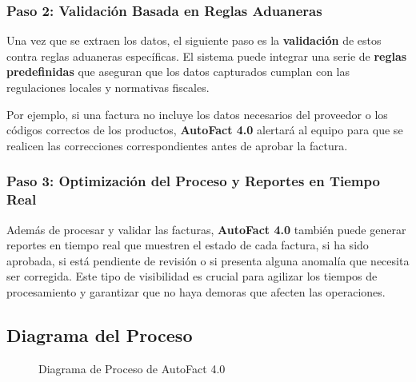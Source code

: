 \subsubsection{Paso 2: Validación Basada en Reglas Aduaneras}

Una vez que se extraen los datos, el siguiente paso es la \textbf{validación} de estos contra reglas aduaneras específicas. El sistema puede integrar una serie de \textbf{reglas predefinidas} que aseguran que los datos capturados cumplan con las regulaciones locales y normativas fiscales.

Por ejemplo, si una factura no incluye los datos necesarios del proveedor o los códigos correctos de los productos, \textbf{AutoFact 4.0} alertará al equipo para que se realicen las correcciones correspondientes antes de aprobar la factura.

\subsubsection{Paso 3: Optimización del Proceso y Reportes en Tiempo Real}

Además de procesar y validar las facturas, \textbf{AutoFact 4.0} también puede generar reportes en tiempo real que muestren el estado de cada factura, si ha sido aprobada, si está pendiente de revisión o si presenta alguna anomalía que necesita ser corregida. Este tipo de visibilidad es crucial para agilizar los tiempos de procesamiento y garantizar que no haya demoras que afecten las operaciones.

\subsection{Diagrama del Proceso}

\begin{figure}[H]
    \centering
    \caption{Diagrama de Proceso de AutoFact 4.0}
\end{figure}
